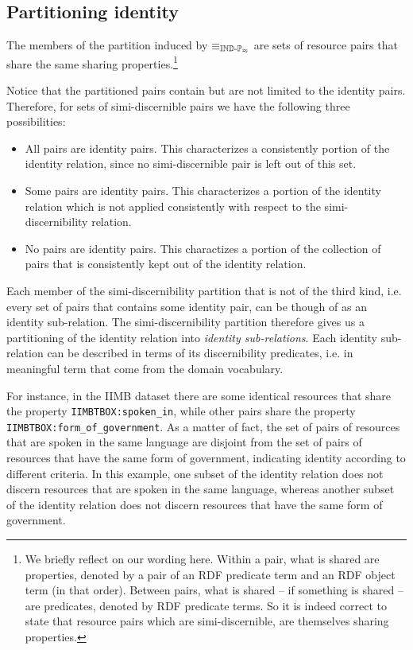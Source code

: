 \subsection{Partitioning identity}

The members of the partition induced by $\equiv_{\operatorname{{\mathbb{IND}-\mathbb{P}}}_{\approx}}$
  are sets of resource pairs that share the same sharing properties.\footnote{
    We briefly reflect on our wording here.
    Within a pair, what is shared are properties,
      denoted by a pair of an RDF predicate term and an RDF object term
      (in that order).
    Between pairs, what is shared -- if something is shared -- are predicates,
      denoted by RDF predicate terms.
    So it is indeed correct to state that
      resource pairs which are simi-discernible,
      are themselves sharing properties.
  }

Notice that the partitioned pairs contain but are not limited to
  the identity pairs.
Therefore, for sets of simi-discernible pairs
  we have the following three possibilities:
  \begin{itemize}
    \item All pairs are identity pairs.
          This characterizes a consistently portion of the identity relation,
          since no simi-discernible pair is left out of this set.
    \item Some pairs are identity pairs.
          This characterizes a portion of the identity relation which is not
          applied consistently with respect to the simi-discernibility relation.
    \item No pairs are identity pairs.
          This charactizes a portion of the collection of pairs
          that is consistently kept out of the identity relation.
  \end{itemize}

\noindent Each member of the simi-discernibility partition that is not
  of the third kind, i.e. every set of pairs that contains some identity pair,
  can be though of as an identity sub-relation.
The simi-discernibility partition therefore gives us
  a partitioning of the identity relation
  into \emph{identity sub-relations}.
Each identity sub-relation can be described in terms of
  its discernibility predicates,
  i.e. in meaningful term that come from the domain vocabulary.

For instance, in the IIMB dataset there are some identical resources that
  share the property \verb|IIMBTBOX:spoken_in|, while other pairs share
  the property \verb|IIMBTBOX:form_of_government|.
As a matter of fact, the set of pairs of resources that are spoken in
  the same language are disjoint from the set of pairs of resources
  that have the same form of government,
  indicating identity according to different criteria.
In this example, one subset of the identity relation does not discern
  resources that are spoken in the same language, whereas another subset
  of the identity relation does not discern resources that have the same
  form of government.



